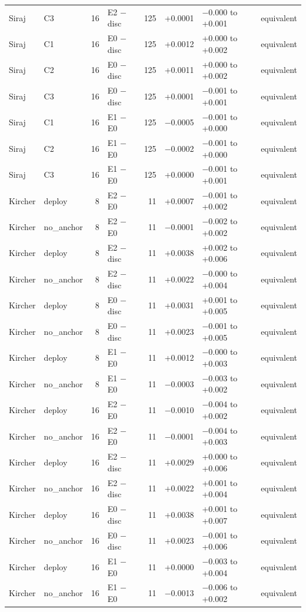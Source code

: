 {\begin{longtable}{llrlrrll}
Siraj & C3 & 16 & E2 $-$ disc & 125 & +0.0001 & $-$0.000 to +0.001 & equivalent  \\
Siraj & C1 & 16 & E0 $-$ disc & 125 & +0.0012 & +0.000 to +0.002 & equivalent  \\
Siraj & C2 & 16 & E0 $-$ disc & 125 & +0.0011 & +0.000 to +0.002 & equivalent  \\
Siraj & C3 & 16 & E0 $-$ disc & 125 & +0.0001 & $-$0.001 to +0.001 & equivalent  \\
Siraj & C1 & 16 & E1 $-$ E0 & 125 & $-$0.0005 & $-$0.001 to +0.000 & equivalent  \\
Siraj & C2 & 16 & E1 $-$ E0 & 125 & $-$0.0002 & $-$0.001 to +0.000 & equivalent  \\
Siraj & C3 & 16 & E1 $-$ E0 & 125 & +0.0000 & $-$0.001 to +0.001 & equivalent  \\
Kircher & deploy & 8 & E2 $-$ E0 & 11 & +0.0007 & $-$0.001 to +0.002 & equivalent  \\
Kircher & no\_anchor & 8 & E2 $-$ E0 & 11 & $-$0.0001 & $-$0.002 to +0.002 & equivalent  \\
Kircher & deploy & 8 & E2 $-$ disc & 11 & +0.0038 & +0.002 to +0.006 & equivalent  \\
Kircher & no\_anchor & 8 & E2 $-$ disc & 11 & +0.0022 & $-$0.000 to +0.004 & equivalent  \\
Kircher & deploy & 8 & E0 $-$ disc & 11 & +0.0031 & +0.001 to +0.005 & equivalent  \\
Kircher & no\_anchor & 8 & E0 $-$ disc & 11 & +0.0023 & $-$0.001 to +0.005 & equivalent  \\
Kircher & deploy & 8 & E1 $-$ E0 & 11 & +0.0012 & $-$0.000 to +0.003 & equivalent  \\
Kircher & no\_anchor & 8 & E1 $-$ E0 & 11 & $-$0.0003 & $-$0.003 to +0.002 & equivalent  \\
Kircher & deploy & 16 & E2 $-$ E0 & 11 & $-$0.0010 & $-$0.004 to +0.002 & equivalent  \\
Kircher & no\_anchor & 16 & E2 $-$ E0 & 11 & $-$0.0001 & $-$0.004 to +0.003 & equivalent  \\
Kircher & deploy & 16 & E2 $-$ disc & 11 & +0.0029 & +0.000 to +0.006 & equivalent  \\
Kircher & no\_anchor & 16 & E2 $-$ disc & 11 & +0.0022 & +0.001 to +0.004 & equivalent  \\
Kircher & deploy & 16 & E0 $-$ disc & 11 & +0.0038 & +0.001 to +0.007 & equivalent  \\
Kircher & no\_anchor & 16 & E0 $-$ disc & 11 & +0.0023 & $-$0.001 to +0.006 & equivalent  \\
Kircher & deploy & 16 & E1 $-$ E0 & 11 & +0.0000 & $-$0.003 to +0.004 & equivalent  \\
Kircher & no\_anchor & 16 & E1 $-$ E0 & 11 & $-$0.0013 & $-$0.006 to +0.002 & equivalent  \\
\bottomrule
\end{longtable}}

